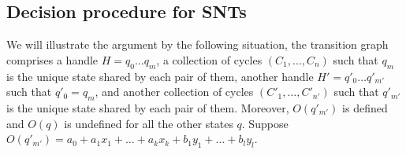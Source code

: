 
%
%
%
%



\subsection{Decision procedure for SNTs}\label{sec-gflat}

We will illustrate the argument by the following situation, the transition graph comprises a handle $H=q_0\dots q_{m}$,  a collection of cycles $(C_1,\dots,C_n)$ such that $q_m$ is the unique state shared by each pair of them, another handle $H'=q'_0 \dots q'_{m'}$ such that $q'_0=q_m$, and another collection of cycles $(C'_1,\dots,C'_{n'})$ such that $q'_{m'}$ is the unique state shared by each pair of them. Moreover, $O(q'_{m'})$ is defined and $O(q)$ is undefined for all the other states $q$. Suppose $O(q'_{m'}) = a_0 + a_1 x_1 + \dots + a_k x_k + b_1 y_1 + \dots + b_l y_l$.

